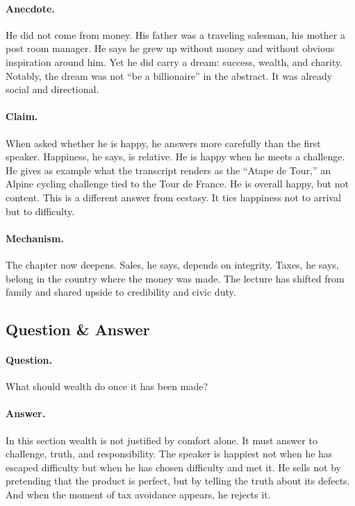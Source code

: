\paragraph{Anecdote.} He did not come from money. His father was a traveling salesman, his mother a post room manager. He says he grew up without money and without obvious inspiration around him. Yet he did carry a dream: success, wealth, and charity. Notably, the dream was not ``be a billionaire'' in the abstract. It was already social and directional.

\paragraph{Claim.} When asked whether he is happy, he answers more carefully than the first speaker. Happiness, he says, is relative. He is happy when he meets a challenge. He gives as example what the transcript renders as the ``Atape de Tour,'' an Alpine cycling challenge tied to the Tour de France. He is overall happy, but not content. This is a different answer from ecstasy. It ties happiness not to arrival but to difficulty.

\paragraph{Mechanism.} The chapter now deepens. Sales, he says, depends on integrity. Taxes, he says, belong in the country where the money was made. The lecture has shifted from family and shared upside to credibility and civic duty.

\subsection{Question \& Answer}

\paragraph{Question.} What should wealth do once it has been made?

\paragraph{Answer.} In this section wealth is not justified by comfort alone. It must answer to challenge, truth, and responsibility. The speaker is happiest not when he has escaped difficulty but when he has chosen difficulty and met it. He sells not by pretending that the product is perfect, but by telling the truth about its defects. And when the moment of tax avoidance appears, he rejects it.

